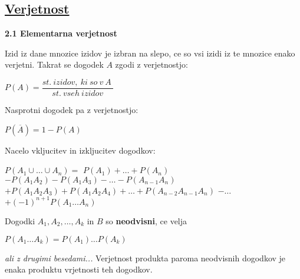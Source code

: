 \documentclass{article}
\begin{document}
\begin{multicols}{3}
	\section{\underline{Verjetnost}}


	\textbf{2.1 Elementarna verjetnost}
	\smallskip

	Izid iz dane mnozice izidov je izbran na slepo, ce so vsi izidi
	iz te mnozice enako verjetni. Takrat se dogodek $A$ zgodi z verjetnostjo:
	\begin{center}
		\begin{math}
			P(A) = \dfrac{st.\: izidov,\: ki\: so\: v\: A\:}{st.\: vseh\: izidov}
		\end{math}
	\end{center}
	Nasprotni dogodek pa z verjetnostjo:
	\begin{center}
		\begin{math}
			P(\overline{A}) = 1 - P(A)
		\end{math}
	\end{center}
	Nacelo vkljucitev in izkljucitev dogodkov:
	\begin{center}
		\begin{math}
			P(A_{1} \cup \dots \cup A_{n}) =
		\end{math}
		\begin{math}
			P(A_{1}) + \dots + P(A_{n})
		\end{math}
		\begin{math}
			- P(A_{1} A_{2}) - P(A_{1} A_{3}) - \dots - P(A_{n - 1} A_{n})
		\end{math}
		\begin{math}
			+ P(A_{1} A_{2} A_{3}) +P (A_{1} A_{2} A_{4}) + \dots + P(A_{n - 2} A_{n - 1} A_{n})
		\end{math}
		\begin{math}
			- \dots
		\end{math}
		\begin{math}
			+ (-1)^{n + 1} P(A_{1} \dots A_{n})
		\end{math}
	\end{center}
	Dogodki $A_{1}, A_{2}, \dots , A_{k}$ in $B$ so \textbf{neodvisni}, ce velja
	\begin{center}
		\begin{math}
			P(A_{1} \dots A_{k}) = P(A_{1}) \dots P(A_{k})
		\end{math}
	\end{center}
	\textit{ali z drugimi besedami...} Verjetnost produkta paroma neodvisnih
	dogodkov je enaka produktu vrjetnosti teh dogodkov.


\end{multicols}
\end{document}
